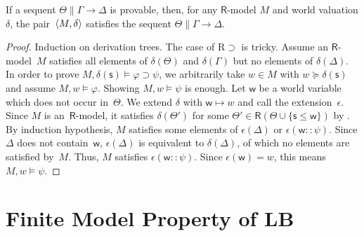    \begin{proposition}
    \label{sound}
    If a sequent $\Theta\parallel \Gamma\longrightarrow \Delta$ is
    provable,
    then, for any $\mathsf R$-model $M$ and world valuation $\delta$,
    the pair~$\langle{M,\delta}\rangle$ satisfies the sequent $\Theta\parallel
    \Gamma\rightarrow\Delta$.
   \end{proposition}
   \begin{proof}
    Induction on derivation trees.
    The case of R$\supset$ is tricky.
    Assume an $\mathsf R$-model~$M$ satisfies all elements of
    $\delta(\Theta)$ and $\delta(\Gamma)$ but no elements of $\delta(\Delta)$.
    In order to prove $M,\delta(\mathsf s)\models\varphi\supset\psi$, we
    arbitrarily take $w\in M$ with $ w\succeq \delta(\mathsf s)$ and assume $M,
    w\models\varphi$.
    Showing $M,w\models\psi$ is enough.
    Let $\mathsf w$ be a world variable which does not occur in~$\Theta$.
    We extend $\delta$ with $\mathsf{w}\mapsto w$ and call the extension~$\epsilon$.
    Since $M$ is an~$\mathsf R$-model,
    it satisfies $\delta(\Theta')$ for some $\Theta'\in \mathsf R(\Theta\cup
    \{\mathsf s\le \mathsf w\})$ by .
    By induction hypothesis, $M$ satisfies some elements of $\epsilon(\Delta)$ or
    $\epsilon(\mathsf w::\psi)$. Since $\Delta$ does not contain~$\mathsf w$,
    $\epsilon(\Delta)$ is equivalent to $\delta(\Delta)$, of which no elements are
    satisfied by~$M$.
    Thus, $M$ satisfies $\epsilon(\mathsf w::\psi)$.
    Since $\epsilon(\mathsf w) = w$, this means $M,  w\models\psi$.
   \end{proof}

  \section{Finite Model Property of LB}
  \label{fmplb}

